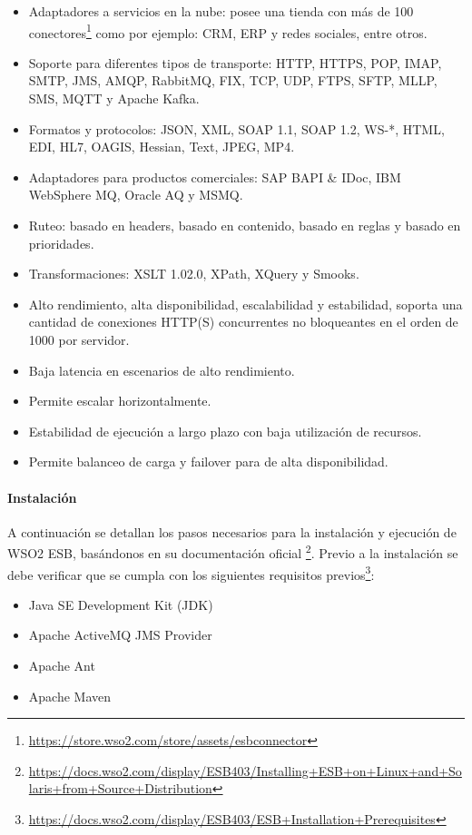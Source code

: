 \begin{itemize}
  \item Adaptadores a servicios en la nube: posee una tienda con más de 100 conectores\footnote{\url{https://store.wso2.com/store/assets/esbconnector}} como por ejemplo: CRM, ERP y redes sociales, entre otros.
  \item Soporte para diferentes tipos de transporte: HTTP, HTTPS, POP, IMAP, SMTP, JMS, AMQP, RabbitMQ, FIX, TCP, UDP, FTPS, SFTP, MLLP, SMS, MQTT y Apache Kafka.
  \item Formatos y protocolos: JSON, XML, SOAP 1.1, SOAP 1.2, WS-*, HTML, EDI, HL7, OAGIS, Hessian, Text, JPEG, MP4.
  \item Adaptadores para productos comerciales: SAP BAPI \& IDoc, IBM WebSphere MQ, Oracle AQ y MSMQ.
  \item Ruteo: basado en headers, basado en contenido, basado en reglas y basado en prioridades.
  \item Transformaciones: XSLT 1.0\/2.0, XPath, XQuery y Smooks.
  \item Alto rendimiento, alta disponibilidad, escalabilidad y estabilidad, soporta una cantidad de conexiones HTTP(S) concurrentes no bloqueantes en el orden de 1000 por servidor.
  \item Baja latencia en escenarios de alto rendimiento.
  \item Permite escalar horizontalmente.
  \item Estabilidad de ejecución a largo plazo con baja utilización de recursos.
  \item Permite balanceo de carga y failover para  de alta disponibilidad.
\end{itemize}


\paragraph{Instalación}

A continuación se detallan los pasos necesarios para la instalación y ejecución de WSO2 ESB, basándonos en su documentación oficial \footnote{\url{https://docs.wso2.com/display/ESB403/Installing+ESB+on+Linux+and+Solaris+from+Source+Distribution}}.  Previo a la instalación se debe verificar que se cumpla con los siguientes requisitos previos\footnote{\url{https://docs.wso2.com/display/ESB403/ESB+Installation+Prerequisites}}:

\begin{itemize}
  \item Java SE Development Kit (JDK)
  \item Apache ActiveMQ JMS Provider
  \item Apache Ant
  \item Apache Maven
\end{itemize}

